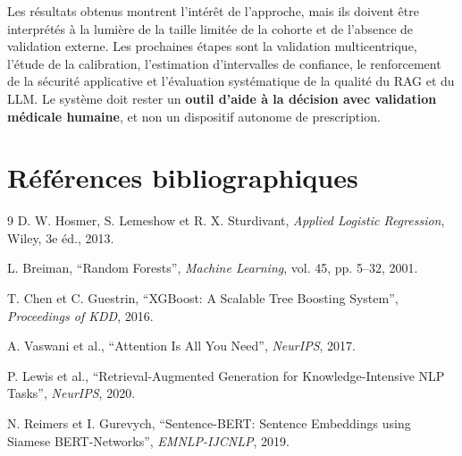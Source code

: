 \documentclass[12pt,a4paper]{report}
\begin{document}
Les résultats obtenus montrent l'intérêt de l'approche, mais ils doivent être interprétés
à la lumière de la taille limitée de la cohorte et de l'absence de validation externe.
Les prochaines étapes sont la validation multicentrique, l'étude de la calibration,
l'estimation d'intervalles de confiance, le renforcement de la sécurité applicative et
l'évaluation systématique de la qualité du RAG et du LLM. Le système doit rester un
\textbf{outil d'aide à la décision avec validation médicale humaine}, et non un dispositif
autonome de prescription.


\chapter*{Références bibliographiques}
\begin{thebibliography}{9}
D. W. Hosmer, S. Lemeshow et R. X. Sturdivant,
\emph{Applied Logistic Regression}, Wiley, 3e éd., 2013.

L. Breiman, ``Random Forests'', \emph{Machine Learning}, vol. 45, pp. 5--32, 2001.

T. Chen et C. Guestrin, ``XGBoost: A Scalable Tree Boosting System'',
\emph{Proceedings of KDD}, 2016.

A. Vaswani et al., ``Attention Is All You Need'', \emph{NeurIPS}, 2017.

P. Lewis et al., ``Retrieval-Augmented Generation for Knowledge-Intensive NLP Tasks'',
\emph{NeurIPS}, 2020.

N. Reimers et I. Gurevych, ``Sentence-BERT: Sentence Embeddings using Siamese BERT-Networks'',
\emph{EMNLP-IJCNLP}, 2019.
\end{thebibliography}
\end{document}
